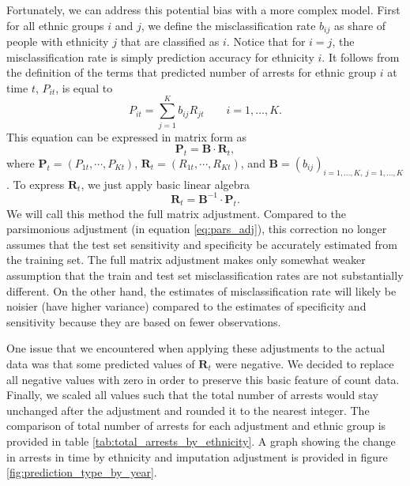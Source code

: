 Fortunately, we can address this potential bias with a more complex model.
First for all ethnic groups $i$ and $j$, we define the misclassification rate $b_{ij}$ as share of people with ethnicity $j$ that are classified as $i$.
Notice that for $i = j$, the misclassification rate is simply prediction accuracy for ethnicity $i$.
It follows from the definition of the terms that predicted number of arrests for ethnic group $i$ at time $t$,  $P_{it}$, is equal to 
\begin{equation}
P_{it}  = \sum_{j = 1}^{K} b_{ij} R_{jt} \qquad i = 1, \dots, K.
\end{equation}
This equation can be expressed in matrix form as
\begin{equation}
 \mathbf{P}_t = \mathbf{B} \cdot \mathbf{R}_t,
\end{equation}
where $\mathbf{P}_t = \left(P_{1t}, \cdots, P_{Kt} \right)$, $\mathbf{R}_t = \left(R_{1t}, \cdots, R_{Kt} \right)$, and $\mathbf{B} = \left(b_{ij}\right)_{i = 1, \dots, K,\:j = 1, \dots, K}$.
To express $\mathbf{R}_t$, we just  apply basic linear algebra
\begin{equation} \label{eq:full_matrix_adj}
\mathbf{R}_t  = \mathbf{B}^{-1} \cdot  \mathbf{P}_t.
\end{equation}
We will call this method the full matrix adjustment. Compared to the parsimonious adjustment (in equation \ref{eq:pars_adj}), this correction no longer assumes that the test set sensitivity and specificity be accurately estimated  from the training set.  The full matrix adjustment
makes only somewhat weaker assumption that the train and test set misclassification rates are not substantially different. On the other hand, the estimates of misclassification rate will likely be noisier (have higher variance) compared to the estimates of specificity and sensitivity because they are based on fewer observations. 

One issue that we encountered when applying these adjustments to the actual data was that some predicted values of $\mathbf{R}_t$ were negative. We decided to replace all  negative values with zero in order to preserve this basic feature of count data. Finally, we scaled all   values such that the total number of arrests would stay unchanged after the adjustment and rounded it to the nearest integer.
The comparison of total number of arrests for each  adjustment and ethnic group is provided in table \ref{tab:total_arrests_by_ethnicity}. A graph showing the change in arrests in time by ethnicity and imputation adjustment is provided in figure \ref{fig:prediction_type_by_year}. 

